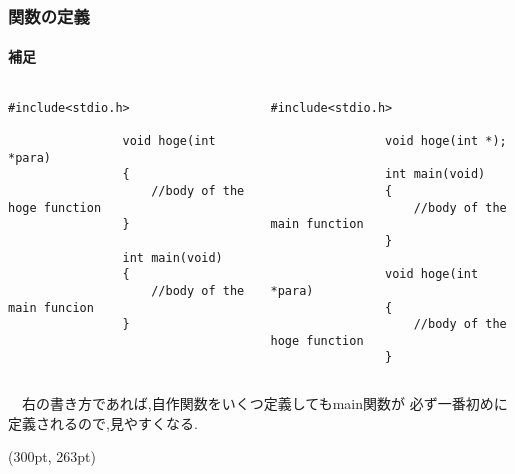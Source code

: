 \documentclass[dvipdfmx]{beamer}
\begin{document}
\begin{frame}[t, fragile]
    \frametitle{関数の定義}
    \framesubtitle{補足}
    \vspace{-30pt}
    \begin{columns}[t, totalwidth=0.98\linewidth]
        \begin{column}{.45\linewidth}
            \begin{lstlisting}[gobble=16, caption=Example\_1]
                #include<stdio.h>
                
                void hoge(int *para)
                {
                    //body of the hoge function
                }

                int main(void)
                {   
                    //body of the main funcion
                }
            \end{lstlisting}
        \end{column}
        \begin{column}{.51\linewidth}
            \begin{lstlisting}[gobble=16, caption=Example\_2]
                #include<stdio.h>

                void hoge(int *);

                int main(void)
                {
                    //body of the main function
                }

                void hoge(int *para)
                {
                    //body of the hoge function
                }
            \end{lstlisting}
        \end{column}
    \end{columns}
    　右の書き方であれば,自作関数をいくつ定義してもmain関数が
    必ず一番初めに定義されるので,見やすくなる.
    \begin{textblock*}{0.3\linewidth}(300pt, 263pt)
    \space
    \end{textblock*}
\end{frame}
\end{document}
